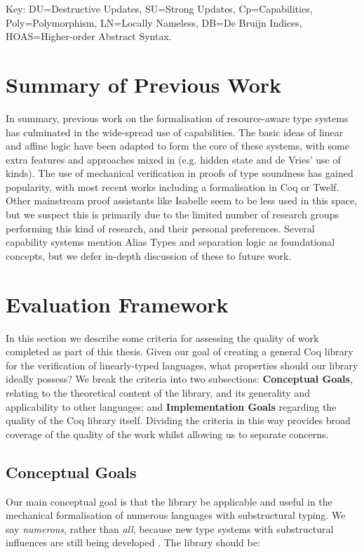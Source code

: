 \documentclass[]{unswthesis}
\let\i\textit
\let\b\textbf
\begin{document}
Key: DU=Destructive Updates, SU=Strong Updates, Cp=Capabilities, Poly=Polymorphism, LN=Locally Nameless, DB=De Bruijn Indices, HOAS=Higher-order Abstract Syntax.

\section{Summary of Previous Work}

In summary, previous work on the formalisation of resource-aware type systems has culminated in the wide-spread use of capabilities. The basic ideas of linear and affine logic have been adapted to form the core of these systems, with some extra features and approaches mixed in (e.g. hidden state and de Vries' use of kinds). The use of mechanical verification in proofs of type soundness has gained popularity, with most recent works including a formalisation in Coq or Twelf. Other mainstream proof assistants like Isabelle seem to be less used in this space, but we suspect this is primarily due to the limited number of research groups performing this kind of research, and their personal preferences. Several capability systems mention Alias Types \cite{smith00} and separation logic \cite{reynolds02} as foundational concepts, but we defer in-depth discussion of these to future work.

\section{Evaluation Framework}
\label{sec:eval-framework}

In this section we describe some criteria for assessing the quality of work completed as part of this thesis. Given our goal of creating a general Coq library for the verification of linearly-typed languages, what properties should our library ideally possess? We break the criteria into two subsections: \b{Conceptual Goals}, relating to the theoretical content of the library, and its generality and applicability to other languages; and \b{Implementation Goals} regarding the quality of the Coq library itself. Dividing the criteria in this way provides broad coverage of the quality of the work whilst allowing us to separate concerns.

\subsection{Conceptual Goals}

Our main conceptual goal is that the library be applicable and useful in the mechanical formalisation of numerous languages with substructural typing. We say \i{numerous}, rather than \i{all}, because new type systems with substructural influences are still being developed \cite{mcbride16}. The library should be:
\end{document}
